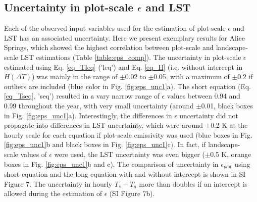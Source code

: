 \documentclass[fleqn,10pt]{wlscirep}
\begin{document}
\subsection{Uncertainty in plot-scale $\epsilon$ and LST}
Each of the observed input variables used for the estimation of plot-scale $\epsilon$ and LST has an associated uncertainty. Here we present exemplary results for Alice Springs, which showed the highest correlation between plot-scale and landscape-scale LST estimations (Table \ref{table:eps_comp}).
The uncertainty in plot-scale $\epsilon$ estimated using Eq. \ref{eq_Tleq} ('leq') and Eq. \ref{eq_H} (i.e. without intercept in $H(\Delta  T)$) was mainly in the range of $\pm$0.02 to $\pm$0.05, with a maximum of $\pm$0.2 if outliers are included (blue color in Fig. \ref{fig:eps_unc1}a). The short equation (Eq.\ref{eq_Tseq}, 'seq') resulted in a vary narrow range of $\epsilon$ values between 0.94 and 0.99 throughout the year, with very small uncertainty (around $\pm$0.01, black boxes in Fig. \ref{fig:eps_unc1}a). Interestingly, the differences in $\epsilon$ uncertainty did not propagate into differences in LST uncertainty, which were around $\pm$0.2 K at the hourly scale for each equation if plot-scale emissivity was used (blue boxes in Fig. \ref{fig:eps_unc1}b and black boxes in Fig. \ref{fig:eps_unc1}c). In fact, if landscape-scale values of $\epsilon$ were used, the LST uncertainty was even bigger ($\pm$0.5 K, orange boxes in Fig. \ref{fig:eps_unc1}b and c). The comparison of uncertainty in $\epsilon_{plot}$ using short equation and the long equation with and without intercept is shown in SI Figure 7. The uncertainty in hourly $T_{s} -T_{a}$ more than doubles if an intercept is allowed during the estimation of $\epsilon$ (SI Figure 7b).
\end{document}
